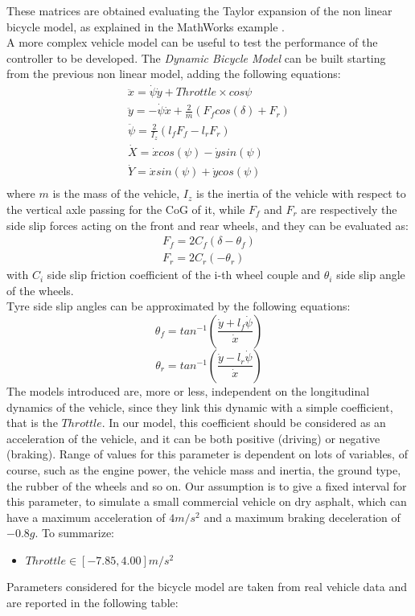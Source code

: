 These matrices are obtained evaluating the Taylor expansion of the non linear bicycle model, as explained in the MathWorks example \cite{StaticObs}.\\
A more complex vehicle model can be useful to test the performance of the controller to be developed. The \textit{Dynamic Bicycle Model} \cite{7225830} can be built starting from the previous non linear model, adding the following equations:
\begin{align}
    \ddot{x} = \dot{\psi}\dot{y} + Throttle\times cos{\psi}\\
    \ddot{y} = -\dot{\psi}\dot{x} + \frac{2}{m}\left(F_fcos(\delta) + F_r\right)\\
    \ddot{\psi} = \frac{2}{I_z}\left(l_fF_f - l_rF_r\right)\\
    \dot{X} = \dot{x}cos(\psi) - \dot{y}sin(\psi)\\
    \dot{Y} = \dot{x}sin(\psi) + \dot{y}cos(\psi)\\
\end{align}
where $m$ is the mass of the vehicle, $I_z$ is the inertia of the vehicle with respect to the vertical axle passing for the CoG of it, while $F_f$ and $F_r$ are respectively the side slip forces acting on the front and rear wheels, and they can be evaluated as:
\begin{align}
    F_f = 2C_f\left(\delta - \theta_f\right)\\
    F_r = 2C_r\left(-\theta_r\right)
\end{align}
with $C_i$ side slip friction coefficient of the i-th wheel couple and $\theta_i$ side slip angle of the wheels.\\
Tyre side slip angles can be approximated by the following equations:
\begin{equation}
    \theta_f=tan^{-1}\left(\frac{\dot{y} + l_f\dot{\psi}}{\dot{x}}\right)
\end{equation}
\begin{equation}
    \theta_r=tan^{-1}\left(\frac{\dot{y} - l_r\dot{\psi}}{\dot{x}}\right)
\end{equation}
The models introduced are, more or less, independent on the longitudinal dynamics of the vehicle, since they link this dynamic with a simple coefficient, that is the $Throttle$. In our model, this coefficient should be considered as an acceleration of the vehicle, and it can be both positive (driving) or negative (braking). Range of values for this parameter is dependent on lots of variables, of course, such as the engine power, the vehicle mass and inertia, the ground type, the rubber of the wheels and so on. Our assumption is to give a fixed interval for this parameter, to simulate a small commercial vehicle on dry asphalt, which can have a maximum acceleration of $4 m/s^2$ and a maximum braking deceleration of $-0.8g$. To summarize:
\begin{itemize}
    \item $Throttle \in [-7.85, 4.00]m/s^2$
    \label{item:Throttle}
\end{itemize}
Parameters considered for the bicycle model are taken from real vehicle data \cite{10.2307/44733900} and are reported in the following table:

